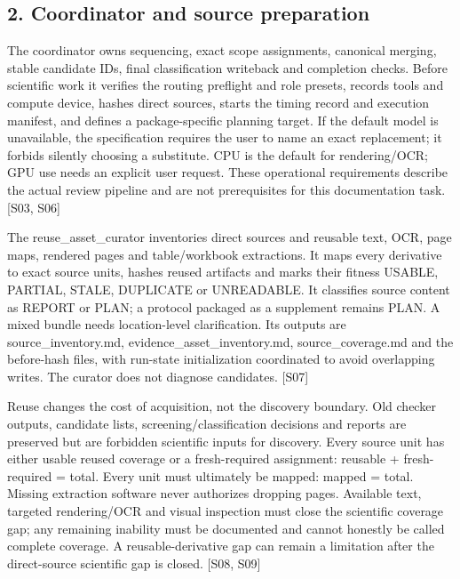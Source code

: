 \documentclass[10pt,a4paper]{article}
\begin{document}
\subsection*{2.\allowbreak{} Coordinator and source preparation}
The coordinator owns sequencing, exact scope assignments, canonical merging, stable candidate IDs, final classification writeback and completion checks.\allowbreak{} Before scientific work it verifies the routing preflight and role presets, records tools and compute device, hashes direct sources, starts the timing record and execution manifest, and defines a package-\allowbreak{}specific planning target.\allowbreak{} If the default model is unavailable, the specification requires the user to name an exact replacement; it forbids silently choosing a substitute.\allowbreak{} CPU is the default for rendering/\allowbreak{}OCR; GPU use needs an explicit user request.\allowbreak{} These operational requirements describe the actual review pipeline and are not prerequisites for this documentation task.\allowbreak{} [S03, S06]\par
The reuse\_\allowbreak{}asset\_\allowbreak{}curator inventories direct sources and reusable text, OCR, page maps, rendered pages and table/\allowbreak{}workbook extractions.\allowbreak{} It maps every derivative to exact source units, hashes reused artifacts and marks their fitness USABLE, PARTIAL, STALE, DUPLICATE or UNREADABLE.\allowbreak{} It classifies source content as REPORT or PLAN; a protocol packaged as a supplement remains PLAN.\allowbreak{} A mixed bundle needs location-\allowbreak{}level clarification.\allowbreak{} Its outputs are source\_\allowbreak{}inventory.\allowbreak{}md, evidence\_\allowbreak{}asset\_\allowbreak{}inventory.\allowbreak{}md, source\_\allowbreak{}coverage.\allowbreak{}md and the before-\allowbreak{}hash files, with run-\allowbreak{}state initialization coordinated to avoid overlapping writes.\allowbreak{} The curator does not diagnose candidates.\allowbreak{} [S07]\par
Reuse changes the cost of acquisition, not the discovery boundary.\allowbreak{} Old checker outputs, candidate lists, screening/\allowbreak{}classification decisions and reports are preserved but are forbidden scientific inputs for discovery.\allowbreak{} Every source unit has either usable reused coverage or a fresh-\allowbreak{}required assignment: reusable + fresh-\allowbreak{}required = total.\allowbreak{} Every unit must ultimately be mapped: mapped = total.\allowbreak{} Missing extraction software never authorizes dropping pages.\allowbreak{} Available text, targeted rendering/\allowbreak{}OCR and visual inspection must close the scientific coverage gap; any remaining inability must be documented and cannot honestly be called complete coverage.\allowbreak{} A reusable-\allowbreak{}derivative gap can remain a limitation after the direct-\allowbreak{}source scientific gap is closed.\allowbreak{} [S08, S09]\par
\end{document}
